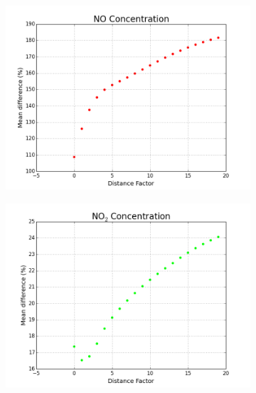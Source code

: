 			\begin{figure}[H]
                \centering
                \begin{subfigure}{0.6\textwidth}
                    \centering
                    \includegraphics[width=\linewidth]{./images/IDW_P_NO.png}
                    \caption{}
                    \label{fig:idw_power_NO}
                \end{subfigure}
                \begin{subfigure}{0.6\textwidth}
                    \includegraphics[width=\linewidth]{./images/IDW_P_NO2.png}
                    \caption{}
                    \label{fig:idw_power_NO2}
                \end{subfigure}

\end{figure}
